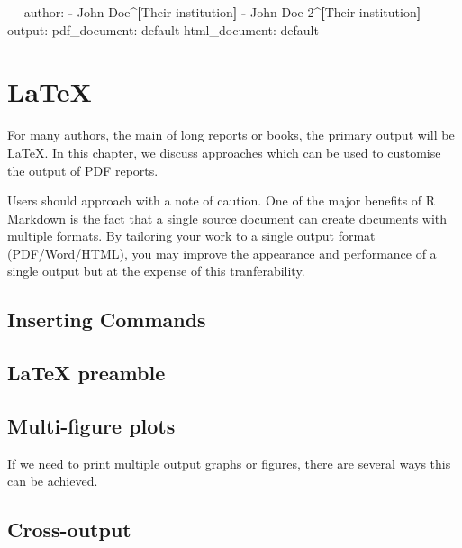 \documentclass[]{book}
\newenvironment{Shaded}{\begin{snugshade}}{\end{snugshade}}
\newcommand{\KeywordTok}[1]{\textcolor[rgb]{0.13,0.29,0.53}{\textbf{#1}}}
\newcommand{\OtherTok}[1]{\textcolor[rgb]{0.56,0.35,0.01}{#1}}
\newcommand{\FunctionTok}[1]{\textcolor[rgb]{0.00,0.00,0.00}{#1}}
\newcommand{\AttributeTok}[1]{\textcolor[rgb]{0.77,0.63,0.00}{#1}}
\newcommand{\NormalTok}[1]{#1}
\begin{document}
\begin{Shaded}
\begin{Highlighting}[]
\OtherTok{---}
\FunctionTok{author:}
\KeywordTok{-}\NormalTok{ John Doe^}\KeywordTok{[}\NormalTok{Their institution}\KeywordTok{]}
\KeywordTok{-}\NormalTok{ John Doe 2^}\KeywordTok{[}\NormalTok{Their institution}\KeywordTok{]}
\FunctionTok{output:}
  \FunctionTok{pdf_document:}\AttributeTok{ default}
  \FunctionTok{html_document:}\AttributeTok{ default}
\OtherTok{---}
\end{Highlighting}
\end{Shaded}

\chapter{LaTeX}\label{latex}

For many authors, the main of long reports or books, the primary output
will be LaTeX. In this chapter, we discuss approaches which can be used
to customise the output of PDF reports.

Users should approach with a note of caution. One of the major benefits
of R Markdown is the fact that a single source document can create
documents with multiple formats. By tailoring your work to a single
output format (PDF/Word/HTML), you may improve the appearance and
performance of a single output but at the expense of this
tranferability.

\section{Inserting Commands}\label{inserting-commands}

\section{LaTeX preamble}\label{latex-preamble}

\section{Multi-figure plots}\label{multi-figure-plots}

If we need to print multiple output graphs or figures, there are several
ways this can be achieved.

\section{Cross-output}\label{cross-output}
\end{document}
